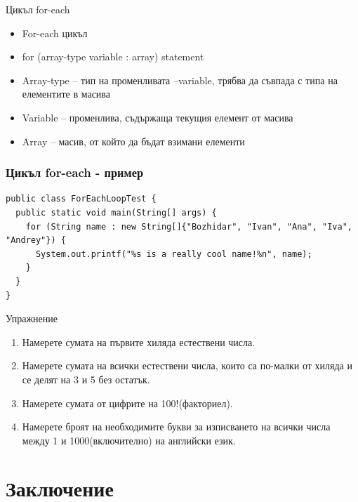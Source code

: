 \documentclass{beamer}
\begin{document}
\begin{frame}{Цикъл for-each}
  \transdissolve
  \begin{itemize}
  \item For-each цикъл
    \item for (array-type variable : array) statement

    \item Array-type – тип на променливата
    –variable, трябва да съвпада с типа на
    елементите в масива
    \item Variable – променлива, съдържаща
    текущия елемент от масива
    \item Array – масив, от който да бъдат
    взимани елементи

  \end{itemize}
\end{frame}

\begin{frame}[fragile]
  \frametitle{Цикъл for-each - пример}
  \transdissolve
\begin{lstlisting}
public class ForEachLoopTest {
  public static void main(String[] args) {
    for (String name : new String[]{"Bozhidar", "Ivan", "Ana", "Iva", "Andrey"}) {
      System.out.printf("%s is a really cool name!%n", name);
    }
  }
}  
\end{lstlisting}
\end{frame}

\begin{frame}{Упражнение}
  \transdissolve  
  \begin{enumerate}
    \item Намерете сумата на първите хиляда естествени числа.
    \item Намерете сумата на всички естествени числа, които са
      по-малки от хиляда и се делят на 3 и 5 без остатък.
    \item Намерете сумата от цифрите на 100!(факториел).
    \item Намерете броят на необходимите букви за изписването на
      всички числа между 1 и 1000(включително) на английски език.
  \end{enumerate}

\end{frame}

\section*{Заключение}
\end{document}
